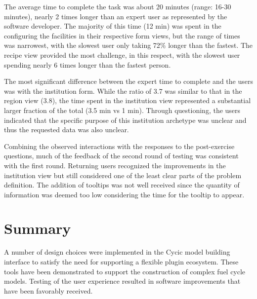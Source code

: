 The average time to complete the task was about 20 minutes (range: 16-30
minutes), nearly 2 times longer than an expert user as represented by the
software developer.  The majority of this time (12 min) was spent in the
configuring the facilities in their respective form views, but the range of
times was narrowest, with the slowest user only taking 72\% longer than the
fastest.  The recipe view provided the most challenge, in this respect, with
the slowest user spending nearly 6 times longer than the fastest person.

The most significant difference between the expert time to complete and the
users was with the institution form.  While the ratio of 3.7 was similar to
that in the region view (3.8), the time spent in the institution view
represented a substantial larger fraction of the total (3.5 min vs 1 min).
Through questioning, the users indicated that the specific purpose of this
institution archetype was unclear and thus the requested data was also
unclear.

Combining the observed interactions with the responses to the post-exercise
questions, much of the feedback of the second round of testing was consistent
with the first round.  Returning users recognized the improvements in the
institution view but still considered one of the least clear parts of the
problem definition.  The addition of tooltips was not well received since the
quantity of information was deemed too low considering the time for the
tooltip to appear.

\section{Summary}

A number of design choices were implemented in the Cycic model building
interface to satisfy the need for supporting a flexible plugin ecosystem.
These tools have been demonstrated to support the construction of complex fuel
cycle models.  Testing of the user experience resulted in software
improvements that have been favorably received.
